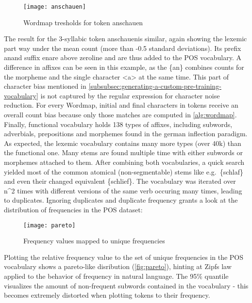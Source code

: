 \begin{figure}[H]
    \centering
    \texttt{[image: anschauen]}
    \caption[Wordmap for \textquotesingle anschauen\textquotesingle]{Wordmap tresholds for token \textquotesingle anschauen\textquotesingle}
    \label{fig:wordmap3}
\end{figure}

The result for the 3-syllabic token \textquotesingle anschauen\textquotesingle is similar, again showing the lexemic part way under the mean count (more than -0.5 standard deviations).
Its prefix \textquotesingle an\textquotesingle and suffix \textquotesingle en\textquotesingle are above zeroline and are thus added to the POS vocabulary.
A difference in affixes can be seen in this example, as the \{an\} combines counts for the morpheme and the single character <a> at the same time.
This part of character bias mentioned in \autoref{subsubsec:generating-a-custom-pre-training-vocabulary} is not captured by the regular expression for character noise reduction.
For every Wordmap, initial and final characters in tokens receive an overall count bias because only those matches are computed in \autoref{alg:wordmap}.
Finally, functional vocabulary holds 138 types of affixes, including subwords, adverbials, prepositions and morphemes found in the german inflection paradigm.
As expected, the lexemic vocabulary contains many more types (over 40k) than the functional one.
Many stems are found multiple time with either subwords or morphemes attached to them.
After combining both vocabularies, a quick search yielded most of the common atomical (non-segmentable) stems like e.g.\ \{schlaf\} and even their changed equivalent \{schlief\}.
The vocabulary was iterated over n^{2} times with different versions of the same verb occuring many times, leading to duplicates.
Ignoring duplicates and duplicate frequency grants a look at the distribution of frequencies in the POS dataset:

\begin{figure}[H]
    \centering
    \texttt{[image: pareto]}
    \caption[Pareto distribution in POS vocabulary]{Frequency values mapped to unique frequencies}
    \label{fig:pareto}
\end{figure}

Plotting the relative frequency value to the set of unique frequencies in the POS vocabulary shows a pareto-like disribution (\autoref{fig:pareto}), hinting at Zipf\textquotesingle s law applied to the behavior of frequency in natural language.
The 95\% quantile visualizes the amount of non-frequent subwords contained in the vocabulary - this becomes extremely distorted when plotting tokens to their frequency.

